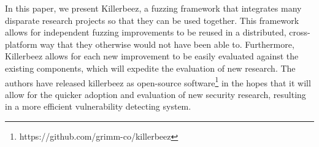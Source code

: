 In this paper, we present Killerbeez, a fuzzing framework that integrates many
disparate research projects so that they can be used together. This framework
allows for independent fuzzing improvements to be reused in a distributed,
cross-platform way that they otherwise would not have been able to. Furthermore,
Killerbeez allows for each new improvement to be easily evaluated against the
existing components, which will expedite the evaluation of new research.  The
authors have released killerbeez as open-source
software\footnote{https://github.com/grimm-co/killerbeez} in the hopes that it
will allow for the quicker adoption and evaluation of new security research,
resulting in a more efficient vulnerability detecting system.
